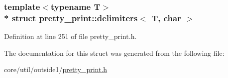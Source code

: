 \subsubsection*{template$<$typename T$>$\\*
struct pretty\+\_\+print\+::delimiters$<$ T, char $>$}



Definition at line 251 of file pretty\+\_\+print.\+h.



The documentation for this struct was generated from the following file\+:\begin{DoxyCompactItemize}
\item 
core/util/outside1/\hyperlink{pretty__print_8h}{pretty\+\_\+print.\+h}\end{DoxyCompactItemize}
